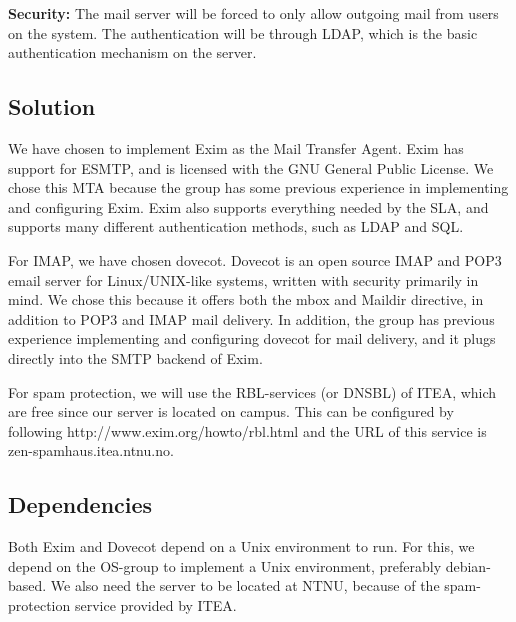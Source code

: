 \documentclass[12pt]{article}
\begin{document}
\textbf{Security:}
The mail server will be forced to only allow outgoing mail from users on
the system. The authentication will be through LDAP, which is the basic
authentication mechanism on the server.

\subsection{Solution}

We have chosen to implement Exim\cite{exim} as the Mail Transfer Agent. Exim has
support for ESMTP, and is licensed with the GNU General Public
License\cite{gnu-license}. We chose this MTA because the group has some previous
experience in implementing and configuring Exim. Exim also supports
everything needed by the SLA, and supports many different authentication
methods, such as LDAP and SQL. 

For IMAP, we have chosen dovecot. Dovecot is an open source IMAP and
POP3 email server for Linux/UNIX-like systems, written with security
primarily in mind\cite{dovecot}. We chose this because it offers both the mbox and
Maildir directive, in addition to POP3 and IMAP mail delivery. In
addition, the group has previous experience implementing and configuring
dovecot for mail delivery, and it plugs directly into the SMTP backend
of Exim.

For spam protection, we will use the RBL-services (or DNSBL)  of ITEA,
which are free since our server is located on campus. This can be
configured by following http://www.exim.org/howto/rbl.html and the URL
of this service is zen-spamhaus.itea.ntnu.no.

\subsection{Dependencies}
Both Exim and Dovecot depend on a Unix environment to run. For this, we
depend on the OS-group to implement a Unix environment, preferably
debian-based.
We also need the server to be located at NTNU, because of the
spam-protection service provided by ITEA. 

\newpage


\end{document}
